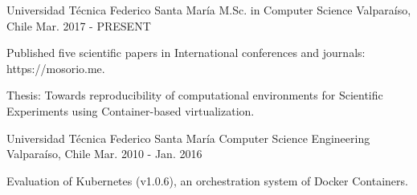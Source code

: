 \begin{cventries}
  \cventry
    {Universidad Técnica Federico Santa María}
        {M.Sc. in Computer Science}
    {Valparaíso, Chile}
    {Mar. 2017 - PRESENT}
    {
      \begin{cvitems}
        \item {Published five scientific papers in International conferences and journals: https://mosorio.me.}
        \item{Thesis: Towards reproducibility of computational environments for Scientific Experiments using Container-based virtualization.}
      \end{cvitems}
    }
    
  \cventry
      {Universidad Técnica Federico Santa María}
    {Computer Science Engineering}
    {Valparaíso, Chile}
    {Mar. 2010 - Jan. 2016}
    {
      \begin{cvitems}
        \item {Evaluation of Kubernetes (v1.0.6), an orchestration system of Docker Containers. }
        \end{cvitems}
    }
\end{cventries}
